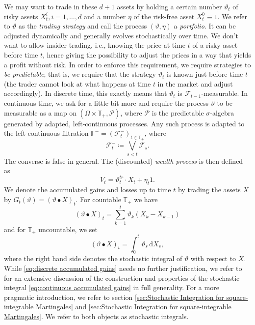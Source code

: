 \documentclass[11pt,a4paper,twoside,openany]{report}
\numberwithin{equation}{section}
\newcommand{\diff}{\mathrm{d}}
\theoremstyle{plain} %
\theoremstyle{definition} %
\theoremstyle{remark} %
\let\parencite\authnumparencite
\begin{document}
We may want to trade in these \(d+1\) assets by holding a certain number \(\vartheta_t\) of risky assets \(X_t^i,i=1,\dots,d\) and a number \(\eta\) of the risk-free asset \(X_t^0\equiv 1\). We refer to \(\vartheta\) as the \textit{trading strategy} and call the process \((\vartheta,\eta)\) a \textit{portfolio}. It can be adjusted dynamically and generally evolves stochastically over time. We don't want to allow insider trading, i.e., knowing the price at time \(t\) of a risky asset before time \(t\), hence giving the possibility to adjust the prices in a way that yields a profit without risk. In order to enforce this requirement, we require strategies to \textit{be predictable}; that is, we require that the strategy \(\vartheta_t\) is known just before time \(t\) (the trader cannot look at what happens at time \(t\) in the market and adjust accordingly). In discrete time, this exactly means that \(\vartheta_t\) is \(\mathcal{F}_{t-1}\)-measurable. In continuous time, we ask for a little bit more and require the process \(\vartheta\) to be measurable as a map on \((\Omega\times\mathbb{T}_+,\mathcal{P})\), where \(\mathcal{P}\) is the predictable \(\sigma\)-algebra generated by adapted, left-continuous processes. Any such process is adapted to the left-continuous filtration \(\mathbb{F}^-=(\mathcal{F}^{-}_{t})_{t\in\mathbb{T}_+}\), where 
\begin{equation*}
    \mathcal{F}_t^{-}\coloneqq\bigvee_{s<t}\mathcal{F}_s.
\end{equation*}
The converse is false in general.
The (discounted) \textit{wealth process} is then defined as 
\begin{equation*}
    V_t = \vartheta_t^{tr}\cdot X_t+\eta_t1.
\end{equation*}
We denote the accumulated gains and losses up to time \(t\) by trading the assets \(X\) by \(G_t(\vartheta) = (\vartheta \bullet X)_t\). For countable  \(\mathbb{T}_+\) we have
\begin{equation}\label{eq:discrete accumulated gains}
    (\vartheta \bullet X)_t=\sum_{k=1}^{t}\vartheta_k(X_{k}-X_{k-1})
\end{equation}
and for \(\mathbb{T}_+\) uncountable, we set
\begin{equation}\label{eq:continuous accumulated gains}
    (\vartheta \bullet X)_t=\int_0^t\vartheta_s\,\diff X_s,
\end{equation} 
where the right hand side denotes the stochastic integral of \(\vartheta\) with respect to \(X\). While \eqref{eq:discrete accumulated gains} needs no further justification, we refer to \parencite[Ch.II,Ch.IV]{Protter2005StochasticIntegration} for an extensive discussion of the construction and properties of the stochastic integral \eqref{eq:continuous accumulated gains} in full generality. For a more pragmatic introduction, we refer to section \ref{sec:Stochastic Integration for square-integrable Martingales} and \ref{sec:Stochastic Integration for square-integrable Martingales}. We refer to both objects as stochastic integrals. 
\end{document}

